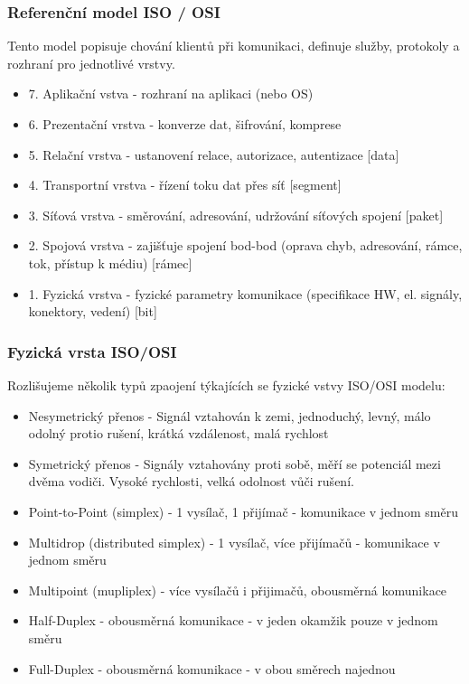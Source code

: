 \subsubsection*{Referenční model ISO / OSI}
Tento model popisuje chování klientů při komunikaci, definuje služby, protokoly a rozhraní pro jednotlivé vrstvy.
\begin{itemize}
  \item 7. Aplikační vstva - rozhraní na aplikaci (nebo OS)
  \item 6. Prezentační vrstva - konverze dat, šifrování, komprese
  \item 5. Relační vrstva - ustanovení relace, autorizace, autentizace [data]
  \item 4. Transportní vrstva - řízení toku dat přes síť [segment] 
  \item 3. Síťová vrstva - směrování, adresování, udržování síťových spojení [paket]
  \item 2. Spojová vrstva - zajišťuje spojení bod-bod (oprava chyb, adresování, rámce, tok, přístup k médiu) [rámec]
  \item 1. Fyzická vrstva - fyzické parametry komunikace (specifikace HW, el. signály, konektory, vedení) [bit]
\end{itemize}

\subsubsection*{Fyzická vrsta ISO/OSI}
Rozlišujeme několik typů zpaojení týkajících se fyzické vstvy ISO/OSI modelu:
\begin{itemize}
  \item Nesymetrický přenos - Signál vztahován k zemi, jednoduchý, levný, málo odolný protio rušení, krátká vzdálenost, malá rychlost
  \item Symetrický přenos - Signály vztahovány proti sobě, měří se potenciál mezi dvěma vodiči. Vysoké rychlosti, velká odolnost vůči rušení.
  \item Point-to-Point (simplex) - 1 vysílač, 1 přijímač - komunikace v jednom směru
  \item Multidrop (distributed simplex) - 1 vysílač, více přijímačů - komunikace v jednom směru
  \item Multipoint (mupliplex) - více vysílačů i přijimačů, obousměrná komunikace
  \item Half-Duplex - obousměrná komunikace - v jeden okamžik pouze v jednom směru
  \item Full-Duplex - obousměrná komunikace - v obou směrech najednou
\end{itemize}

